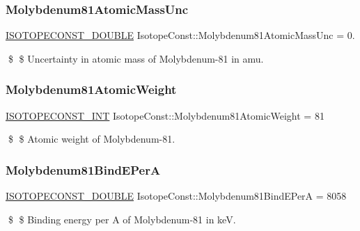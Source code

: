 \subsubsection{\texorpdfstring{Molybdenum81\+Atomic\+Mass\+Unc}{Molybdenum81AtomicMassUnc}}
{\footnotesize\ttfamily \mbox{\hyperlink{group___isotope_const-_macros_ga8f45a7272ce02c0b4c65c44636ed719a}{I\+S\+O\+T\+O\+P\+E\+C\+O\+N\+S\+T\+\_\+\+D\+O\+U\+B\+LE}} Isotope\+Const\+::\+Molybdenum81\+Atomic\+Mass\+Unc = 0.}

\$ \$ Uncertainty in atomic mass of Molybdenum-\/81 in amu. \mbox{\label{group___isotope_const-_molybdenum-_mo81_gad8bde4ce3c064b68156aa56a331079ce}} 
\subsubsection{\texorpdfstring{Molybdenum81\+Atomic\+Weight}{Molybdenum81AtomicWeight}}
{\footnotesize\ttfamily \mbox{\hyperlink{group___isotope_const-_macros_ga5f18360b3e99483a35c32d789e62621c}{I\+S\+O\+T\+O\+P\+E\+C\+O\+N\+S\+T\+\_\+\+I\+NT}} Isotope\+Const\+::\+Molybdenum81\+Atomic\+Weight = 81}

\$ \$ Atomic weight of Molybdenum-\/81. \mbox{\label{group___isotope_const-_molybdenum-_mo81_ga5755dae39886f665c155737836d351e8}} 
\subsubsection{\texorpdfstring{Molybdenum81\+Bind\+E\+PerA}{Molybdenum81BindEPerA}}
{\footnotesize\ttfamily \mbox{\hyperlink{group___isotope_const-_macros_ga8f45a7272ce02c0b4c65c44636ed719a}{I\+S\+O\+T\+O\+P\+E\+C\+O\+N\+S\+T\+\_\+\+D\+O\+U\+B\+LE}} Isotope\+Const\+::\+Molybdenum81\+Bind\+E\+PerA = 8058}

\$ \$ Binding energy per A of Molybdenum-\/81 in keV. \mbox{\label{group___isotope_const-_molybdenum-_mo81_gacf99b77ab8232d2d9c853a7246e41485}} 
